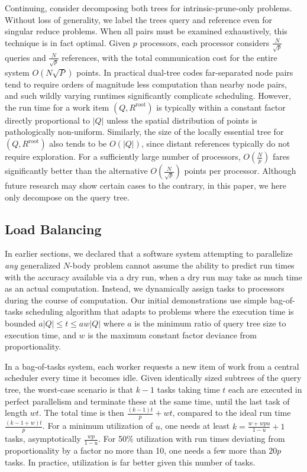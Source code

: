 \documentclass[times, leqno,twocolumn]{article}
\newcommand{\kdroot}[1]{#1^{\text{root}}}
\begin{document}
Continuing, consider decomposing both trees for intrinsic-prune-only problems.
Without loss of generality, we label the trees query and reference even for singular reduce problems.
When all pairs must be examined exhaustively, this technique is in fact optimal.
Given $p$ processors, each processor considers $\frac{N}{\sqrt{p}}$ queries and $\frac{N}{\sqrt{p}}$ references, with the total communication cost for the entire system $O(N\sqrt{P})$ points.
In practical dual-tree codes far-separated node pairs tend to require orders of magnitude less computation than nearby node pairs, and such wildly varying runtimes significantly complicate scheduling.
However, the run time for a work item $(Q, \kdroot{R})$ is typically within a constant factor directly proportional to $|Q|$ unless the spatial distribution of points is pathologically non-uniform.
Similarly, the size of the locally essential tree for $(Q, \kdroot{R})$ also tends to be $O(|Q|)$, since distant references typically do not require exploration.
For a sufficiently large number of processors, $O(\frac{N}{p})$ fares significantly better than the alternative $O(\frac{N}{\sqrt{p}})$ points per processor.
Although future research may show certain cases to the contrary, in this paper, we here only decompose on the query tree.

\subsection{Load Balancing}

In earlier sections, we declared that a software system attempting to parallelize {\it any} generalized $N$-body problem cannot assume the ability to predict run times with the accuracy available via a dry run, when a dry run may take as much time as an actual computation.
Instead, we dynamically assign tasks to processors during the course of computation.
Our initial demonstrations use simple bag-of-tasks scheduling algorithm that adapts to problems where the execution time is bounded $a|Q| \leq t \leq aw|Q|$ where $a$ is the minimum ratio of query tree size to execution time, and $w$ is the maximum constant factor deviance from proportionality.

In a bag-of-tasks system, each worker requests a new item of work from a central scheduler every time it becomes idle.
Given identically sized subtrees of the query tree, the worst-case scenario is that $k - 1$ tasks taking time $t$ each are executed in perfect parallelism and terminate these at the same time, until the last task of length $wt$.
The total time is then $\frac{(k-1)t}{p}+wt$, compared to the ideal run time $\frac{(k-1+w)t}{p}$.
For a minimum utilization of $u$, one needs at least $k = \frac{w+wpu}{1-u}+1$ tasks, asymptotically $\frac{wp}{1-u}$.
For 50\% utilization with run times deviating from proportionality by a factor no more than 10, one needs a few more than $20p$ tasks.
In practice, utilization is far better given this number of tasks.
\end{document}
